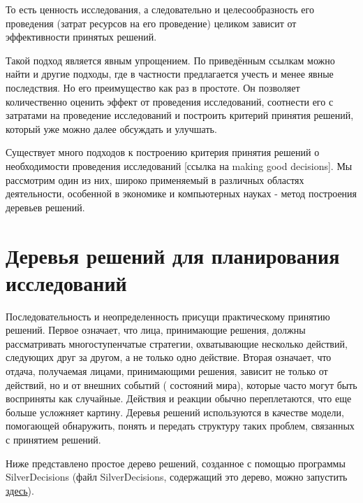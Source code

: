 То есть ценность исследования, а следовательно и целесообразность его проведения (затрат ресурсов на его проведение) целиком зависит от эффективности принятых решений. 

Такой подход является явным упрощением. По приведённым ссылкам можно найти и другие подходы, где в частности предлагается учесть и менее явные последствия. Но его преимущество как раз в простоте. Он позволяет количественно оценить эффект от проведения исследований, соотнести его с затратами на проведение исследований и построить критерий принятия решений, который уже можно далее обсуждать и улучшать. 


Существует много подходов к построению критерия принятия решений о необходимости проведения исследований [ссылка на making good decisions]. Мы рассмотрим один из них, широко применяемый в различных областях деятельности, особенной в экономике и компьютерных науках - метод построения деревьев решений. \cite{AL_appl_patt_2007}

\section{Деревья решений для планирования исследований}

Последовательность и неопределенность присущи практическому принятию решений. Первое означает, что лица, принимающие решения, должны рассматривать многоступенчатые стратегии, охватывающие несколько действий, следующих друг за другом, а не только одно действие. Вторая означает, что отдача, получаемая лицами, принимающими решения, зависит не только от действий, но и от внешних событий ( состояний мира), которые часто могут быть восприняты как случайные. Действия и реакции обычно переплетаются, что еще больше усложняет картину. Деревья решений используются в качестве модели, помогающей обнаружить, понять и передать структуру таких проблем, связанных с принятием решений.

Ниже представлено простое дерево решений, созданное с помощью программы SilverDecisions (файл SilverDecisions, содержащий это дерево, можно запустить \href{http://silverdecisions.pl/SilverDecisions.html?LOAD_SD_TREE_JSON=https://raw.githubusercontent.com/gubkin-rienm/isp/master/data/decision_tree/simple_invest_decision.json}{здесь}).

